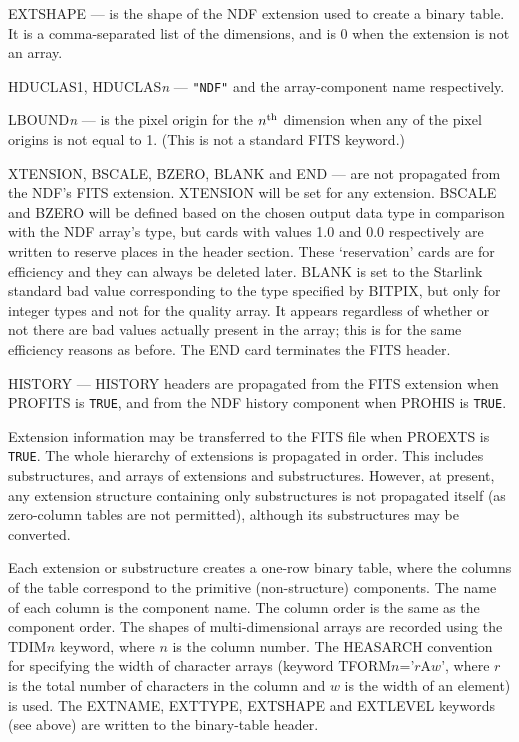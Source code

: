 {{{{            \sstitem
            EXTSHAPE --- is the shape of the NDF extension used to
            create a binary table.  It is a comma-separated list of the
            dimensions, and is 0 when the extension is not an array.

            \sstitem
            HDUCLAS1, HDUCLAS{\em{n}} --- {\tt "NDF"} and the
              array-component name respectively.

            \sstitem
            LBOUND{\em{n}} --- is the pixel origin for the $n^{\rm th}$ dimension
              when any of the pixel origins is not equal to 1.  (This is not a
              standard FITS keyword.)

            \sstitem
            XTENSION, BSCALE, BZERO, BLANK and END --- are not propagated
              from the NDF's FITS extension.  XTENSION will be set for
              any extension.  BSCALE and BZERO will be defined based on
              the chosen output data type in comparison with the NDF
              array's type, but cards with values 1.0 and 0.0 respectively
              are written to reserve places in the header section.  These
              `reservation' cards are for efficiency and they can always
              be deleted later.  BLANK is set to the Starlink standard bad
              value corresponding to the type specified by BITPIX, but only
              for integer types and not for the quality array.  It appears
              regardless of whether or not there are bad values actually
              present in the array; this is for the same efficiency reasons
              as before.  The END card terminates the FITS header.

           \sstitem
              HISTORY --- HISTORY headers are propagated from the FITS
              extension when PROFITS is {\tt TRUE}, and from the NDF
              history component when PROHIS is {\tt TRUE}.

         }

         \sstitem
         Extension information may be transferred to the FITS file when
         PROEXTS is {\tt TRUE}.  The whole hierarchy of extensions is propagated
         in order.  This includes substructures, and arrays of extensions
         and substructures.  However, at present, any extension structure
         containing only substructures is not propagated itself (as
         zero-column tables are not permitted), although its
         substructures may be converted.
 
         Each extension or substructure creates a one-row binary table,
         where the columns of the table correspond to the primitive
         (non-structure) components.  The name of each column is the
         component name.  The column order is the same as the component
         order.  The shapes of multi-dimensional arrays are recorded using
         the TDIM$n$ keyword, where $n$ is the column number.  The HEASARCH
         convention for specifying the width of character arrays (keyword
         TFORM$n$='$r$A$w$', where $r$ is the total number of characters in the
         column and $w$ is the width of an element) is used.  The EXTNAME,
         EXTTYPE, EXTSHAPE and EXTLEVEL keywords (see above) are written
         to the binary-table header.

}}}
